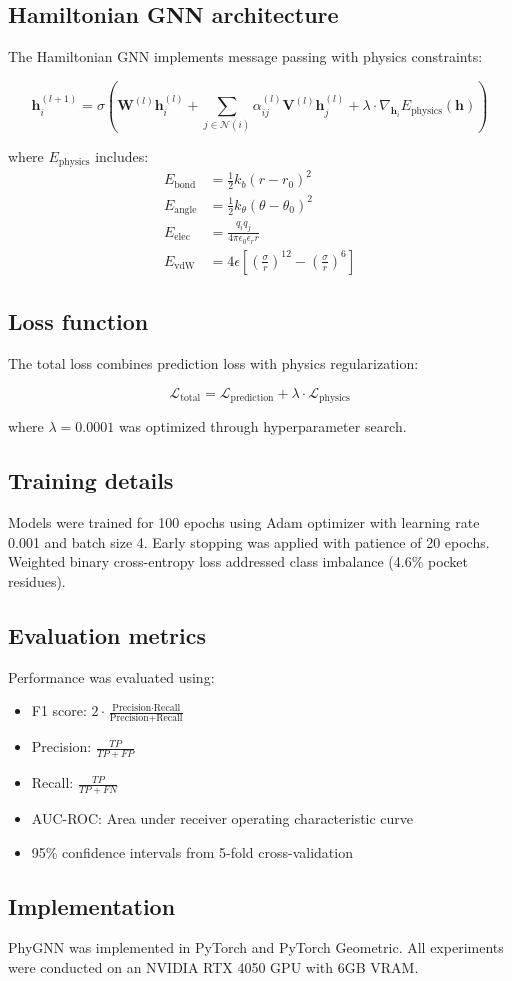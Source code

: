\subsection*{Hamiltonian GNN architecture}
The Hamiltonian GNN implements message passing with physics constraints:

\begin{equation}
\mathbf{h}_i^{(l+1)} = \sigma\left(\mathbf{W}^{(l)}\mathbf{h}_i^{(l)} + \sum_{j\in\mathcal{N}(i)} \alpha_{ij}^{(l)}\mathbf{V}^{(l)}\mathbf{h}_j^{(l)} + \lambda \cdot \nabla_{\mathbf{h}_i}E_{\text{physics}}(\mathbf{h})\right)
\end{equation}

where $E_{\text{physics}}$ includes:
\begin{align}
E_{\text{bond}} &= \frac{1}{2}k_b(r - r_0)^2 \\
E_{\text{angle}} &= \frac{1}{2}k_\theta(\theta - \theta_0)^2 \\
E_{\text{elec}} &= \frac{q_i q_j}{4\pi\epsilon_0\epsilon_r r} \\
E_{\text{vdW}} &= 4\epsilon\left[\left(\frac{\sigma}{r}\right)^{12} - \left(\frac{\sigma}{r}\right)^6\right]
\end{align}

\subsection*{Loss function}
The total loss combines prediction loss with physics regularization:

\begin{equation}
\mathcal{L}_{\text{total}} = \mathcal{L}_{\text{prediction}} + \lambda \cdot \mathcal{L}_{\text{physics}}
\end{equation}

where $\lambda = 0.0001$ was optimized through hyperparameter search.

\subsection*{Training details}
Models were trained for 100 epochs using Adam optimizer with learning rate 0.001 and batch size 4. Early stopping was applied with patience of 20 epochs. Weighted binary cross-entropy loss addressed class imbalance (4.6\% pocket residues).

\subsection*{Evaluation metrics}
Performance was evaluated using:
\begin{itemize}
    \item F1 score: $2 \cdot \frac{\text{Precision} \cdot \text{Recall}}{\text{Precision} + \text{Recall}}$
    \item Precision: $\frac{TP}{TP + FP}$
    \item Recall: $\frac{TP}{TP + FN}$
    \item AUC-ROC: Area under receiver operating characteristic curve
    \item 95\% confidence intervals from 5-fold cross-validation
\end{itemize}

\subsection*{Implementation}
PhyGNN was implemented in PyTorch and PyTorch Geometric. All experiments were conducted on an NVIDIA RTX 4050 GPU with 6GB VRAM.
